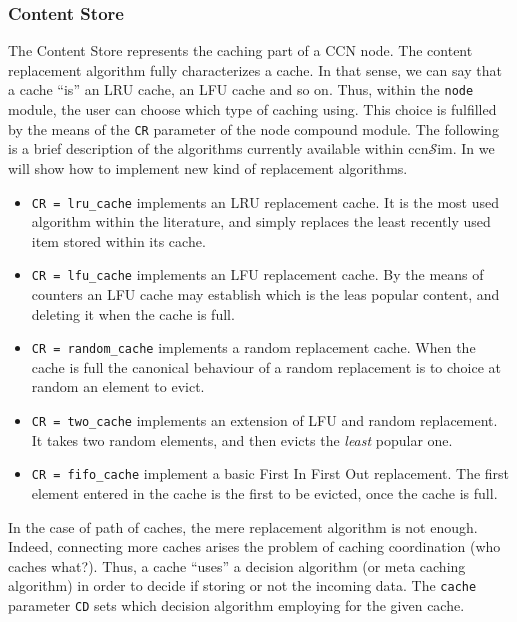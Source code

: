 \documentclass{article}
\newcommand{\ccnsim}{ccn$\mathcal{S}$im}
\begin{document}
\subsubsection{Content Store}
The Content Store represents the caching part of a CCN node. The content replacement algorithm fully characterizes a cache. In that sense, we can say that a cache ``is'' an LRU cache, an LFU cache and so on. Thus, within the \verb|node| module, the user can choose which type of caching using. This choice is fulfilled by the means of the  \verb|CR| parameter of the node compound module. The following is a brief description of the algorithms currently available  within \ccnsim. In  we will show how to implement new kind of replacement algorithms.
\begin{itemize}
    \item\verb|CR = lru_cache| implements an LRU replacement cache. It is the most used algorithm within the literature, and simply replaces the least recently used item stored within its cache. 
    \item\verb|CR = lfu_cache| implements an LFU replacement cache. By the means of counters an LFU cache may establish which is the leas popular content, and deleting it when the cache is full. 
    \item\verb|CR = random_cache| implements a random replacement cache. When the cache is full the canonical behaviour of a random replacement is to choice at random an element to evict. 
    \item\verb|CR = two_cache| implements an extension of LFU and random replacement. It takes two random elements, and then evicts the \emph{least} popular one. 
    \item\verb|CR = fifo_cache| implement a basic First In First Out replacement. The first element entered in the cache is the first to be evicted, once the cache is full. 
\end{itemize}
In the case of path of caches, the mere replacement algorithm is not enough. Indeed, connecting more caches arises the problem of caching coordination (who caches what?). Thus, a cache ``uses'' a decision algorithm (or meta caching algorithm) in order to decide if storing or not the incoming data. The \verb|cache| parameter \verb|CD| sets which decision algorithm employing for the given cache. 
\end{document}
